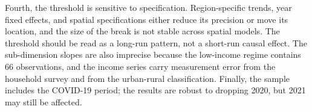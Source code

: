 Fourth, the threshold is sensitive to specification. Region-specific trends, year fixed effects, and spatial specifications either reduce its precision or move its location, and the size of the break is not stable across spatial models. The threshold should be read as a long-run pattern, not a short-run causal effect. The sub-dimension slopes are also imprecise because the low-income regime contains 66 observations, and the income series carry measurement error from the household survey and from the urban-rural classification. Finally, the sample includes the COVID-19 period; the results are robust to dropping 2020, but 2021 may still be affected.
